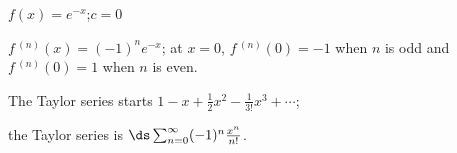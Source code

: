 {$f(x) = e^{-x}$;\quad $c=0$
}
{$f\,^{(n)}(x) = (-1)^ne^{-x}$; at $x=0$, $f\,^{(n)}(0)=-1$ when $n$ is odd and $f\,^{(n)}(0)=1$ when $n$ is even.

The Taylor series starts $1-x+\frac12x^2-\frac1{3!}x^3+\cdots$; 

the Taylor series is $\ds \sum_{n=0}^\infty (-1)^n\frac{x^n}{n!}$.
}